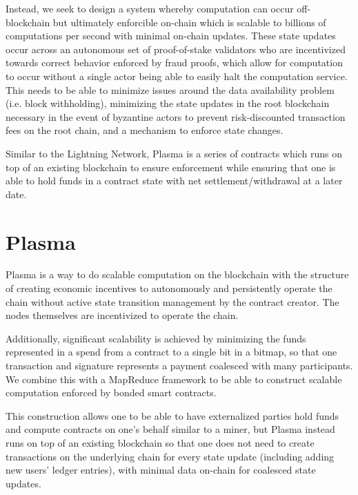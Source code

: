 \documentclass[letterpaper, 11pt]{article}
\begin{document}
Instead, we seek to design a system whereby computation can occur off-blockchain
but ultimately enforcible on-chain which is scalable to billions of computations
per second with minimal on-chain updates. These state updates occur across an
autonomous set of proof-of-stake validators who are incentivized towards correct
behavior enforced by fraud proofs, which allow for computation to occur without
a single actor being able to easily halt the computation service. This needs to
be able to minimize issues around the data availability problem (i.e. block
withholding), minimizing the state updates in the root blockchain necessary in
the event of byzantine actors to prevent risk-discounted transaction fees on the
root chain, and a mechanism to enforce state changes.

Similar to the Lightning Network, Plasma is a series of contracts which runs on
top of an existing blockchain to ensure enforcement while ensuring that one is
able to hold funds in a contract state with net settlement/withdrawal at a later
date.

\section{Plasma}

Plasma is a way to do scalable computation on the blockchain with the structure
of creating economic incentives to autonomously and persistently operate the
chain without active state transition management by the contract creator. The
nodes themselves are incentivized to operate the chain.

Additionally, significant scalability is achieved by minimizing the funds
represented in a spend from a contract to a single bit in a bitmap, so that
one transaction and signature represents a payment coalesced with many
participants. We combine this with a MapReduce\cite{mapreduce} framework to be
able to construct scalable computation enforced by bonded smart contracts.

This construction allows one to be able to have externalized parties hold funds
and compute contracts on one's behalf similar to a miner, but Plasma instead
runs on top of an existing blockchain so that one does not need to create
transactions on the underlying chain for every state update (including adding
new users' ledger entries), with minimal data on-chain for coalesced state
updates.
\end{document}
